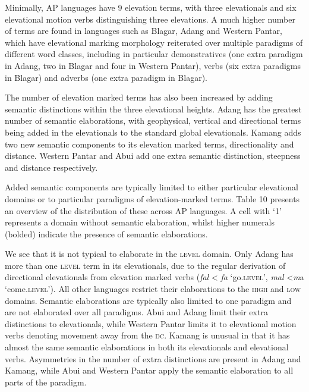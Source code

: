 Minimally, AP languages have 9 elevation terms, with three elevationals and six elevational motion verbs distinguishing three elevations. A much higher number of terms are found in languages such as Blagar, Adang and Western Pantar, which have elevational marking morphology reiterated over multiple paradigms of different word classes, including in particular demonstratives (one extra paradigm in Adang, two in Blagar and four in Western Pantar), verbs (six extra paradigms in Blagar) and adverbs (one extra paradigm in Blagar).

The number of elevation marked terms has also been increased by adding semantic distinctions within the three elevational heights. Adang has the greatest number of semantic elaborations, with geophysical, vertical and directional terms being added in the elevationals to the standard global elevationals. Kamang adds two new semantic components to its elevation marked terms, directionality and distance. Western Pantar and Abui add one extra semantic distinction, steepness and distance respectively.

Added semantic components are typically limited to either particular elevational domains or to particular paradigms of elevation-marked terms. Table 10 presents an overview of the distribution of these across AP languages. A cell with `1' represents a domain without semantic elaboration, whilst higher numerals (bolded) indicate the presence of semantic elaborations.

We see that it is not typical to elaborate in the \textsc{level} domain. Only Adang has more than one \textsc{level} term in its elevationals, due to the regular derivation of directional elevationals from elevation marked verbs (\textit{fal}\textit{{\textepsilon}} {\textless} \textit{fa} `go\textsc{.level',} \textit{mal}\textit{{\textepsilon}} {\textless}\textit ma  `come\textsc{.level'}). All other languages restrict their elaborations to the \textsc{high} and \textsc{low} domains. Semantic elaborations are typically also limited to one paradigm and are not elaborated over all paradigms. Abui and Adang limit their extra distinctions to elevationals, while Western Pantar limits it to elevational motion verbs denoting movement away from the \textsc{dc}. Kamang is unusual in that it has almost the same semantic elaborations in both its elevationals and elevational verbs. Asymmetries in the number of extra distinctions are present in Adang and Kamang, while Abui and Western Pantar apply the semantic elaboration to all parts of the paradigm.


